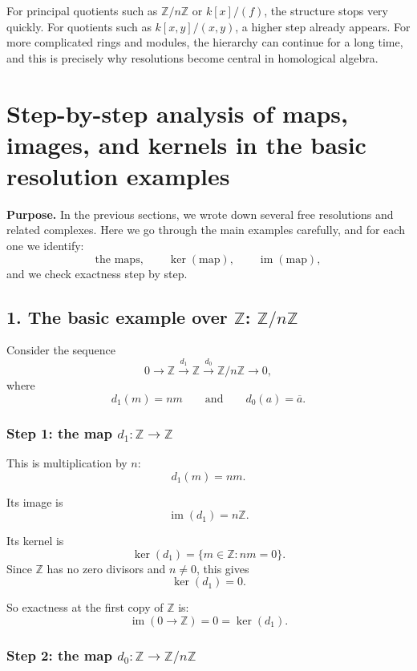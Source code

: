 \documentclass[12pt,a4paper]{article}
\theoremstyle{notespace}
\theoremstyle{definition}
\begin{document}
For principal quotients such as \(\mathbb Z/n\mathbb Z\) or \(k[x]/(f)\), the structure stops very quickly.
For quotients such as \(k[x,y]/(x,y)\), a higher step already appears.
For more complicated rings and modules, the hierarchy can continue for a long time, and this is precisely why resolutions become central in homological algebra.

\section{Step-by-step analysis of maps, images, and kernels in the basic resolution examples}

\textbf{Purpose.}
In the previous sections, we wrote down several free resolutions and related complexes.
Here we go through the main examples carefully, and for each one we identify:
\[
\text{the maps}, \qquad \ker(\text{map}), \qquad \operatorname{im}(\text{map}),
\]
and we check exactness step by step.

\subsection{1. The basic example over \(\mathbb Z\): \(\mathbb Z/n\mathbb Z\)}

Consider the sequence
\[
0 \longrightarrow \mathbb Z \xrightarrow{d_1} \mathbb Z \xrightarrow{d_0} \mathbb Z/n\mathbb Z \longrightarrow 0,
\]
where
\[
d_1(m)=nm
\qquad\text{and}\qquad
d_0(a)=\overline{a}.
\]

\subsubsection*{Step 1: the map \(d_1:\mathbb Z\to\mathbb Z\)}

This is multiplication by \(n\):
\[
d_1(m)=nm.
\]

Its image is
\[
\operatorname{im}(d_1)=n\mathbb Z.
\]

Its kernel is
\[
\ker(d_1)=\{m\in\mathbb Z : nm=0\}.
\]
Since \(\mathbb Z\) has no zero divisors and \(n\neq 0\), this gives
\[
\ker(d_1)=0.
\]

So exactness at the first copy of \(\mathbb Z\) is:
\[
\operatorname{im}(0\to \mathbb Z)=0=\ker(d_1).
\]

\subsubsection*{Step 2: the map \(d_0:\mathbb Z\to \mathbb Z/n\mathbb Z\)}
\end{document}
